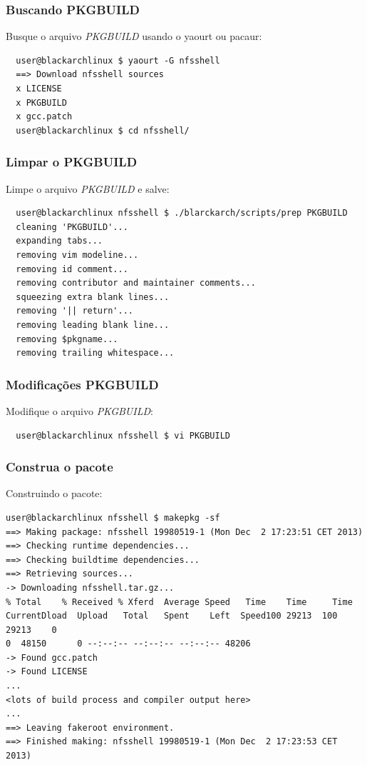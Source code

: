 \documentclass[a4paper, oneside, 11pt]{book}
\begin{document}
\subsubsection{Buscando PKGBUILD}
Busque o arquivo \textit{PKGBUILD} usando o yaourt ou pacaur:
\begin{lstlisting}
  user@blackarchlinux $ yaourt -G nfsshell
  ==> Download nfsshell sources
  x LICENSE
  x PKGBUILD
  x gcc.patch
  user@blackarchlinux $ cd nfsshell/
\end{lstlisting}

\subsubsection{Limpar o PKGBUILD}
Limpe o arquivo \textit{PKGBUILD} e salve:
\begin{lstlisting}
  user@blackarchlinux nfsshell $ ./blarckarch/scripts/prep PKGBUILD
  cleaning 'PKGBUILD'...
  expanding tabs...
  removing vim modeline...
  removing id comment...
  removing contributor and maintainer comments...
  squeezing extra blank lines...
  removing '|| return'...
  removing leading blank line...
  removing $pkgname...
  removing trailing whitespace...
\end{lstlisting}

\subsubsection{Modificações PKGBUILD}
Modifique o arquivo \textit{PKGBUILD}:
\begin{lstlisting}
  user@blackarchlinux nfsshell $ vi PKGBUILD
\end{lstlisting}

\subsubsection{Construa o pacote}
Construindo o pacote:
\begin{lstlisting}user@blackarchlinux nfsshell $ makepkg -sf
==> Making package: nfsshell 19980519-1 (Mon Dec  2 17:23:51 CET 2013)
==> Checking runtime dependencies...
==> Checking buildtime dependencies...
==> Retrieving sources...
-> Downloading nfsshell.tar.gz...
% Total    % Received % Xferd  Average Speed   Time    Time     Time
CurrentDload  Upload   Total   Spent    Left  Speed100 29213  100 29213    0
0  48150      0 --:--:-- --:--:-- --:--:-- 48206
-> Found gcc.patch
-> Found LICENSE
...
<lots of build process and compiler output here>
...
==> Leaving fakeroot environment.
==> Finished making: nfsshell 19980519-1 (Mon Dec  2 17:23:53 CET 2013)
\end{lstlisting}
\end{document}
